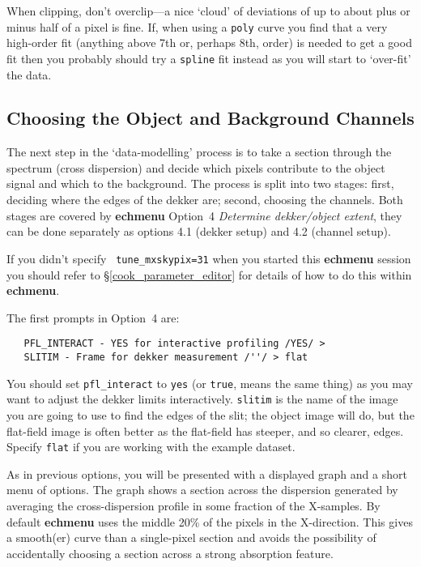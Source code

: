 \documentclass[twoside,11pt]{article}
\newcommand{\htmlref}[2]{#1}
\newcommand{\xref}[3]{#1}
\newcommand{\scspec}[2]{#1}
\newcommand{\scspec}[2]{#2}
\begin{document}
When clipping, don't overclip\scspec{---}{ - }a nice `cloud' of deviations
of up to about plus or minus half of a pixel is fine.  If, when using a
\verb+poly+ curve you find that a very high-order fit (anything above 7th or,
perhaps 8th, order) is needed to get a good fit then you probably should
try a \verb+spline+ fit instead as you will start to `over-fit' the data.


\subsection{Choosing the Object and Background Channels}

The next step in the `data-modelling' process is to take a section through
the spectrum (cross dispersion) and decide which pixels contribute to the
object signal and which to the background.  The process is split into two
stages: first, deciding where the edges of the \htmlref{dekker}{gl_dekker}
are; second, choosing the channels.  Both stages are covered by
\xref{{\bf echmenu}}{sun152}{ECHMENU}
\xref{Option~4 {\sl Determine dekker/object extent}}{sun152}{option4},
they can be done separately as options 4.1 (dekker setup) and 4.2
(channel setup).

If you didn't specify \xref{{\tt
tune\_mxskypix=31}}{sun152}{par_TUNE_MXSKYPIX} when you started this
{\bf echmenu} session you should refer to
\scspec{\S\ref{cook_parameter_editor}}
{\htmlref{How to Use the {\bf echmenu} Parameter Editor}
{cook_parameter_editor}} for details of how to do this within
{\bf echmenu}\@.

The first prompts in Option~4 are:

{
\scspec{\small}{ }
\begin{verbatim}
   PFL_INTERACT - YES for interactive profiling /YES/ >
   SLITIM - Frame for dekker measurement /''/ > flat
\end{verbatim}
}

You should set
\xref{{\tt pfl\_interact}}{sun152}{par_PFL_INTERACT} to \verb+yes+
(or \verb+true+, means the same thing) as you may want to adjust the
dekker limits interactively.
\xref{{\tt{slitim}}}{sun152}{par_SLITIM} is the name of the image you
are going to use to find the edges of the slit; the object image will
do, but the flat-field image is often better as the flat-field has
steeper, and so clearer, edges.
Specify \verb+flat+ if you are working with the example dataset.

As in previous options, you will be presented with a displayed graph and a
short menu of options.  The graph shows a section across the dispersion
generated by averaging the cross-dispersion profile in some fraction
of the X-samples.  By default {\bf echmenu} uses the middle 20\% of the
pixels in the X-direction.
This gives a smooth(er) curve than a single-pixel section
and avoids the possibility of accidentally choosing a section across a
strong absorption feature.
\end{document}
